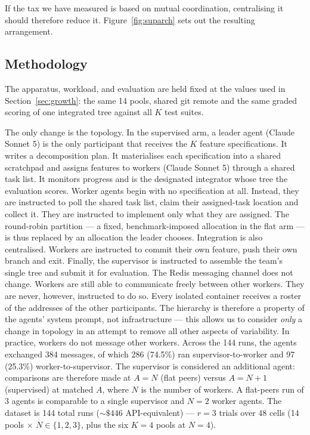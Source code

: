 \documentclass[11pt,a4paper]{article}
\begin{document}
If the tax we have measured is based on mutual coordination, centralising it should therefore reduce it. Figure~\ref{fig:suparch} sets out the resulting arrangement.

\subsection{Methodology}\label{sec:supdesign}

The apparatus, workload, and evaluation are held fixed at the values used in Section~\ref{sec:growth}: the same 14 pools, shared git remote and the same graded scoring of one integrated tree against all $K$ test suites.

The only change is the topology. In the supervised arm, a leader agent (Claude Sonnet 5) is the only participant that receives the $K$ feature specifications. It writes a decomposition plan. It materialises each specification into a shared scratchpad and assigns features to workers (Claude Sonnet 5) through a shared task list. It monitors progress and is the designated integrator whose tree the evaluation scores. Worker agents begin with no specification at all. Instead, they are instructed to poll the shared task list, claim their assigned-task location and collect it. They are instructed to implement only what they are assigned. The round-robin partition --- a fixed, benchmark-imposed allocation in the flat arm --- is thus replaced by an allocation the leader chooses. Integration is also centralised. Workers are instructed to commit their own feature, push their own branch and exit. Finally, the supervisor is instructed to assemble the team's single tree and submit it for evaluation. The Redis messaging channel does not change. Workers are still able to communicate freely between other workers. They are never, however, instructed to do so. Every isolated container receives a roster of the addresses of the other participants. The hierarchy is therefore a property of the agents' system prompt, not infrastructure --- this allows us to consider \emph{only} a change in topology in an attempt to remove all other aspects of variability. In practice, workers do not message other workers. Across the 144 runs, the agents exchanged 384 messages, of which 286 (74.5\%) ran supervisor-to-worker and 97 (25.3\%) worker-to-supervisor. The supervisor is considered an additional agent: comparisons are therefore made at $A = N$ (flat peers) versus $A = N + 1$ (supervised) at matched $A$, where $N$ is the number of workers. A flat-peers run of 3 agents is comparable to a single supervisor and $N = 2$ worker agents. The dataset is 144 total runs (${\sim}\$446$ API-equivalent) --- $r = 3$ trials over 48 cells (14 pools $\times$ $N \in \{1, 2, 3\}$, plus the six $K = 4$ pools at $N = 4$).
\end{document}
